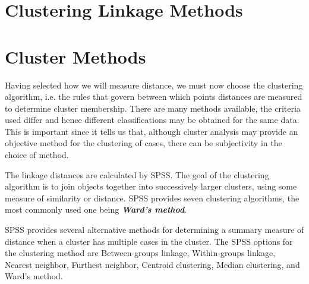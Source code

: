 \documentclass[a4paper,12pt]{article}
\begin{document}
\section{Clustering Linkage Methods}
\newpage



\section{Cluster Methods}
Having selected how we will measure distance, we must now choose the clustering algorithm, i.e. the rules that govern between which points distances are measured to determine cluster membership. There are many methods available, the criteria used differ and hence
different classifications may be obtained for the same data. This is important since it tells us that, although cluster analysis may provide an objective method for the clustering of cases, there can be subjectivity in the choice of method. 

The linkage distances are calculated by SPSS. The goal of the clustering algorithm is to join objects together into successively larger clusters, using some measure of similarity or distance. SPSS provides seven clustering algorithms, the most commonly used one being  \textbf{\textit{Ward's method}}.

SPSS provides several alternative methods for determining a summary measure of distance when a cluster has multiple cases in the cluster.  The SPSS options for the clustering method are Between-groups linkage, Within-groups linkage, Nearest neighbor, Furthest neighbor, Centroid clustering, Median clustering, and Ward's method.
\end{document}
